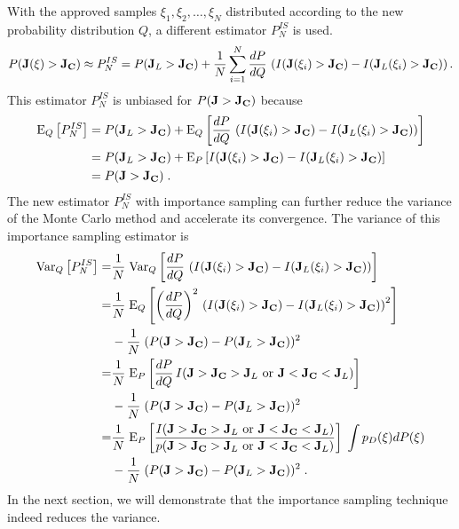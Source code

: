 With the approved samples $\xi_1, \xi_2, \ldots, \xi_N$ distributed according
to the new probability distribution $Q$, a different estimator $P^{IS}_N$
is used.
\[ P({\bf J}(\xi) > {\bf J_C}) \approx P^{IS}_N
 = P({\bf J}_L > {\bf J_C}) + \frac{1}{N}
   \sum_{i=1}^N \frac{dP}{dQ}\,\left(
   I({\bf J}(\xi_i) > {\bf J_C}) - I({\bf J}_L(\xi_i) > {\bf J_C})\right).
\]
This estimator $P^{IS}_N$ is unbiased for $P({\bf J} > {\bf J_C})$ because
\[ \begin{split}
   \mathrm{E}_Q\left[P^{IS}_N\right] &= P({\bf J}_L > {\bf J_C}) +
   \mathrm{E}_Q\left[\frac{dP}{dQ}\,
   \left( I({\bf J}(\xi_i) > {\bf J_C}) - I({\bf J}_L(\xi_i) > {\bf J_C})
   \right)\right] \\
&= P({\bf J}_L > {\bf J_C}) +
   \mathrm{E}_P\left[
   I({\bf J}(\xi_i) > {\bf J_C}) - I({\bf J}_L(\xi_i) > {\bf J_C}) \right] \\
&= P({\bf J} > {\bf J_C}) \;.
\end{split} \]
The new estimator $P^{IS}_N$ with importance sampling can further reduce the
variance of the Monte Carlo method and accelerate its convergence.
The variance of this importance sampling estimator is
\begin{equation} \begin{split} \label{var_is}
   \mathrm{Var}_Q \left[ P^{IS}_N \right]
=& \frac{1}{N}\;\mathrm{Var}_Q \left[ \frac{dP}{dQ}\, \left(
   I({\bf J}(\xi_i) > {\bf J_C}) - I({\bf J}_L(\xi_i) > {\bf J_C})\right)
   \right] \\
=& \frac{1}{N}\;\mathrm{E}_Q \left[ \left(\frac{dP}{dQ}\right)^2\, \left(
   I({\bf J}(\xi_i) > {\bf J_C}) - I({\bf J}_L(\xi_i) > {\bf J_C})\right)^2
   \right] \\
&- \frac{1}{N}\;(P({\bf J} > {\bf J_C}) - P({\bf J}_L > {\bf J_C}))^2 \\
=& \frac{1}{N}\;\mathrm{E}_P \left[ \frac{dP}{dQ}\, 
   I({\bf J} > {\bf J_C} > {\bf J}_L \mbox{ or }
     {\bf J} < {\bf J_C} < {\bf J}_L) \right] \\
&- \frac{1}{N}\;(P({\bf J} > {\bf J_C}) - P({\bf J}_L > {\bf J_C}))^2 \\
=& \frac{1}{N}\;\mathrm{E}_P \left[ \frac{
   I({\bf J} > {\bf J_C} > {\bf J}_L \mbox{ or }
     {\bf J} < {\bf J_C} < {\bf J}_L)}
   {p({\bf J} > {\bf J_C} > {\bf J}_L \mbox{ or }
     {\bf J} < {\bf J_C} < {\bf J}_L)} \right] \; \int p_D(\xi) dP(\xi) \\
&- \frac{1}{N}\;(P({\bf J} > {\bf J_C}) - P({\bf J}_L > {\bf J_C}))^2 \;.
\end{split} \end{equation}
In the next section, we will demonstrate that
the importance sampling technique indeed reduces the variance.


